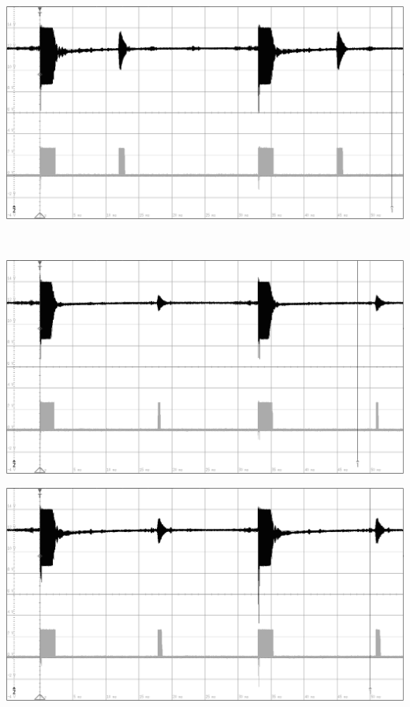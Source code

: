 \begin{minipage}{0.46\textwidth}
\includegraphics[width=1\textwidth%
]{Abbildungen/MessungenP2/10V/2m.PNG}
\end{minipage}\\
\begin{minipage}{0.46\textwidth}
\includegraphics[width=1\textwidth%
]{Abbildungen/MessungenP2/5V/3m.PNG}
\end{minipage}\qquad
\begin{minipage}{0.46\textwidth}
\includegraphics[width=1\textwidth%
]{Abbildungen/MessungenP2/10V/3m.PNG}
\end{minipage}\\
